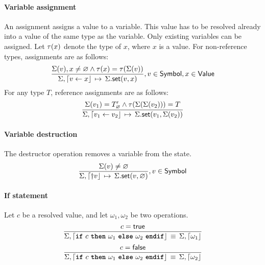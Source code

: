 \paragraph{Variable assignment}
An assignment assigns a value to a variable.
This value has to be resolved already into a value of the same type as the variable.
Only existing variables can be assigned.
Let $\tau(x)$ denote the type of $x$, where $x$ is a value.
For non-reference types, assignments are as follows:
$$
\semrule
	{\Sigma(v), x \neq \varnothing \land
		\typeof{x} = \typeof{\Sigma(v)}}
	{\Sigma, \stmt{v \gets x}}
	{\StSet{\Sigma}{v}{x}},
		v \in \Symbol,
		x \in \Value
$$
For any type $T$, reference assignments are as follows:
$$
\semrule
	{\Sigma(v_1) = \reft{T}_\varnothing \land
		\typeof{\Sigma(\Sigma(v_2))} = T}
	{\Sigma, \stmt{v_1 \gets v_2}}
	{\StSet{\Sigma}{v_1}{\Sigma(v_2)}}
$$

\paragraph{Variable destruction}
The destructor operation removes a variable from the state.
$$
\semrule
	{\Sigma(v) \neq \varnothing}
	{\Sigma, \stmt{\dagger v}}
	{\StSet{\Sigma}{v}{\varnothing}},
		v \in \Symbol
$$


\paragraph{If statement}
Let $c$ be a resolved value, and let $\omega_1, \omega_2$ be two operations.
$$
\semruleeq
	{c = \true}
	{\Sigma, \stmt{\ifstmt{c}{\omega_1}{\omega_2}}}
	{\Sigma, \stmt{\omega_1}}
$$
$$
\semruleeq
	{c = \false}
	{\Sigma, \stmt{\ifstmt{c}{\omega_1}{\omega_2}}}
	{\Sigma, \stmt{\omega_2}}
$$
